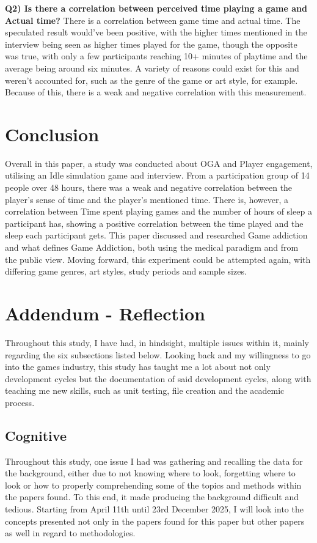 \documentclass[conference]{IEEEtran}
\begin{document}
 \textbf{Q2) Is there a correlation between perceived time playing a game and Actual time?}
There is a correlation between game time and actual time. The speculated result would've been positive, with the higher times mentioned in the interview being seen as higher times played for the game, though the opposite was true, with only a few participants reaching 10+ minutes of playtime and the average being around six minutes. A variety of reasons could exist for this and weren't accounted for, such as the genre of the game or art style, for example. Because of this, there is a weak and negative correlation with this measurement.

\section{Conclusion}
Overall in this paper, a study was conducted about OGA and Player engagement, utilising an Idle simulation game and interview. From a participation group of 14 people over 48 hours, there was a weak and negative correlation between the player's sense of time and the player's mentioned time. There is, however, a correlation between Time spent playing games and the number of hours of sleep a participant has, showing a positive correlation between the time played and the sleep each participant gets. This paper discussed and researched Game addiction and what defines Game Addiction, both using the medical paradigm and from the public view. Moving forward, this experiment could be attempted again, with differing game genres, art styles, study periods and sample sizes.


 
\section {Addendum - Reflection}
Throughout this study, I have had, in hindsight, multiple issues within it, mainly regarding the six subsections listed below. Looking back and my willingness to go into the games industry, this study has taught me a lot about not only development cycles but the documentation of said development cycles, along with teaching me new skills, such as unit testing, file creation and the academic process.
\subsection{Cognitive}
Throughout this study, one issue I had was gathering and recalling the data for the background, either due to not knowing where to look, forgetting where to look or how to properly comprehending some of the topics and methods within the papers found. To this end, it made producing the background difficult and tedious. Starting from April 11th until 23rd December 2025, I will look into the concepts presented not only in the papers found for this paper but other papers as well in regard to methodologies. 
\end{document}
